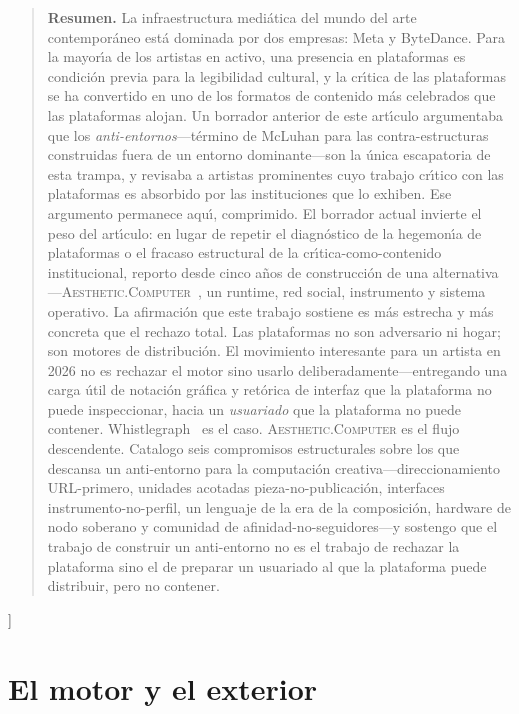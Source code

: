 \documentclass[10pt,letterpaper,twocolumn]{article}
\newcommand{\ac}{\textsc{Aesthetic.Computer}}
\begin{document}
{\begin{quote}
\small\noindent\textbf{Resumen.}
La infraestructura medi\'{a}tica del mundo del arte contempor\'{a}neo est\'{a} dominada por dos empresas: Meta y ByteDance. Para la mayor\'{\i}a de los artistas en activo, una presencia en plataformas es condici\'{o}n previa para la legibilidad cultural, y la cr\'{\i}tica de las plataformas se ha convertido en uno de los formatos de contenido m\'{a}s celebrados que las plataformas alojan. Un borrador anterior de este art\'{\i}culo argumentaba que los \emph{anti-entornos}---t\'{e}rmino de McLuhan para las contra-estructuras construidas fuera de un entorno dominante---son la \'{u}nica escapatoria de esta trampa, y revisaba a artistas prominentes cuyo trabajo cr\'{\i}tico con las plataformas es absorbido por las instituciones que lo exhiben. Ese argumento permanece aqu\'{\i}, comprimido. El borrador actual invierte el peso del art\'{\i}culo: en lugar de repetir el diagn\'{o}stico de la hegemon\'{\i}a de plataformas o el fracaso estructural de la cr\'{\i}tica-como-contenido institucional, reporto desde cinco a\~{n}os de construcci\'{o}n de una alternativa---\ac{}~\citep{scudder2026ac}, un runtime, red social, instrumento y sistema operativo. La afirmaci\'{o}n que este trabajo sostiene es m\'{a}s estrecha y m\'{a}s concreta que el rechazo total. Las plataformas no son adversario ni hogar; son motores de distribuci\'{o}n. El movimiento interesante para un artista en 2026 no es rechazar el motor sino usarlo deliberadamente---entregando una carga \'{u}til de notaci\'{o}n gr\'{a}fica y ret\'{o}rica de interfaz que la plataforma no puede inspeccionar, hacia un \emph{usuariado} que la plataforma no puede contener. Whistlegraph~\citep{scudder2026whistlegraph} es el caso. \ac{} es el flujo descendente. Catalogo seis compromisos estructurales sobre los que descansa un anti-entorno para la computaci\'{o}n creativa---direccionamiento URL-primero, unidades acotadas pieza-no-publicaci\'{o}n, interfaces instrumento-no-perfil, un lenguaje de la era de la composici\'{o}n, hardware de nodo soberano y comunidad de afinidad-no-seguidores---y sostengo que el trabajo de construir un anti-entorno no es el trabajo de rechazar la plataforma sino el de preparar un usuariado al que la plataforma puede distribuir, pero no contener.
\end{quote}
\vspace{0.5em}
}]

\section{El motor y el exterior}
\end{document}
